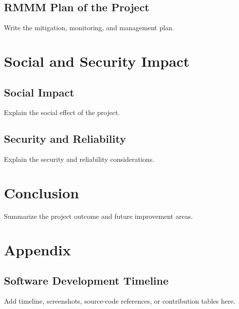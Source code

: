 \documentclass[12pt,a4paper]{report}
\begin{document}
\section{RMMM Plan of the Project}
Write the mitigation, monitoring, and management plan.

\chapter{Social and Security Impact}
\section{Social Impact}
Explain the social effect of the project.

\section{Security and Reliability}
Explain the security and reliability considerations.

\chapter{Conclusion}
Summarize the project outcome and future improvement areas.

\chapter{Appendix}
\section*{Software Development Timeline}
{}
Add timeline, screenshots, source-code references, or contribution tables here.
\end{document}
